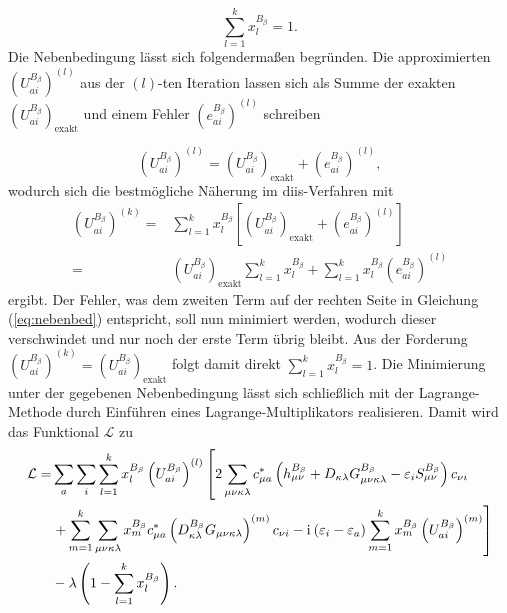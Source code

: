    \begin{equation}
    \sum_{l=1}^k x_l^{B_\beta}=1.
	\end{equation}     
   	Die Nebenbedingung lässt sich folgendermaßen begründen. Die approximierten $\left(U_{ai}^{B_\beta}\right)^{(l)}$ aus der $(l)$-ten Iteration lassen sich als Summe der exakten $\left(U_{ai}^{B_\beta}\right)_\textrm{exakt}$ und einem Fehler $\left(e_{ai}^{B_\beta}\right)^{(l)}$ schreiben
   	
   	\begin{equation}
   	\left(U_{ai}^{B_\beta}\right)^{(l)}=\left(U_{ai}^{B_\beta}\right)_\textrm{exakt}+\left(e_{ai}^{B_\beta}\right)^{(l)},
   	\end{equation}
   	wodurch sich die bestmögliche Näherung im \ac{diis}-Verfahren mit
	\begin{equation}\label{eq:nebenbed}
	\begin{aligned}
	\left(U_{ai}^{B_\beta}\right)^{(k)}=&\sum_{l=1}^k x_l^{B_\beta}\left[\left(U_{ai}^{B_\beta}\right)_\textrm{exakt}+\left(e_{ai}^{B_\beta}\right)^{(l)}\right]\\
	=&\left(U_{ai}^{B_\beta}\right)_\textrm{exakt}\sum_{l=1}^k x_l^{B_\beta}+\sum_{l=1}^k x_l^{B_\beta}\left(e_{ai}^{B_\beta}\right)^{(l)}
	\end{aligned}
	\end{equation}
	ergibt. Der Fehler, was dem zweiten Term auf der rechten Seite in Gleichung (\ref{eq:nebenbed}) entspricht, soll nun minimiert werden, wodurch dieser verschwindet und nur noch der erste Term übrig bleibt. Aus der Forderung $\left(U_{ai}^{B_\beta}\right)^{(k)}=\left(U_{ai}^{B_\beta}\right)_\textrm{exakt}$ folgt damit direkt $\sum_{l=1}^kx_l^{B_\beta}=1$.
	Die Minimierung unter der gegebenen Nebenbedingung lässt sich schließlich mit der Lagrange-Methode durch Einführen eines Lagrange-Multiplikators realisieren. Damit wird das Funktional $\mathcal{L}$ zu
	\begin{equation}
    \begin{aligned}
    \mathcal{L}=&\sum_a\sum_i \sum_{l=1}^k x_l^{B_\beta}\left(U_{ai}^{B_\beta}\right)^{(l)}\left[2\sum_{\mu\nu\kappa\lambda}c_{\mu a}^*\left(h_{\mu\nu}^{B_\beta}+D_{\kappa\lambda}G_{\mu\nu\kappa\lambda}^{B_\beta}-\varepsilon_i S_{\mu\nu}^{B_\beta}\right)c_{\nu i}\right.\\
    &\left.+\sum_{m=1}^k\sum_{\mu\nu\kappa\lambda}x_m^{B_\beta} c_{\mu a}^*\left(D_{\kappa\lambda}^{B_\beta}G_{\mu\nu\kappa\lambda}\right)^{(m)}c_{\nu i}-\mathrm{i}\mkern1mu\left(\varepsilon_i-\varepsilon_a\right)\sum_{m=1}^kx_m^{B_\beta}\left(U_{ai}^{B_\beta}\right)^{(m)}\right]\\
    &-\lambda\left(1-\sum_{l=1}^kx_l^{B_\beta}\right).
    \end{aligned}
    \end{equation}
